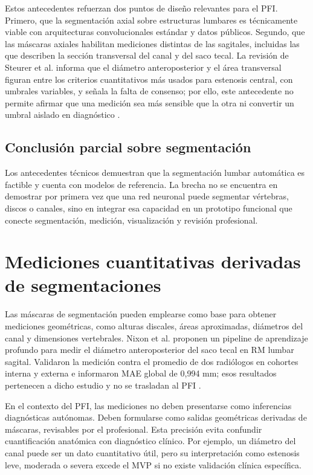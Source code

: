 Estos antecedentes refuerzan dos puntos de diseño relevantes para el PFI. Primero, que la segmentación axial sobre estructuras lumbares es técnicamente viable con arquitecturas convolucionales estándar y datos públicos. Segundo, que las máscaras axiales habilitan mediciones distintas de las sagitales, incluidas las que describen la sección transversal del canal y del saco tecal. La revisión de Steurer et al. informa que el diámetro anteroposterior y el área transversal figuran entre los criterios cuantitativos más usados para estenosis central, con umbrales variables, y señala la falta de consenso; por ello, este antecedente no permite afirmar que una medición sea más sensible que la otra ni convertir un umbral aislado en diagnóstico \parencite{steurer_lumbar_stenosis_2011}.

\subsection{Conclusión parcial sobre segmentación}

Los antecedentes técnicos demuestran que la segmentación lumbar automática es factible y cuenta con modelos de referencia. La brecha no se encuentra en demostrar por primera vez que una red neuronal puede segmentar vértebras, discos o canales, sino en integrar esa capacidad en un prototipo funcional que conecte segmentación, medición, visualización y revisión profesional.

\section{Mediciones cuantitativas derivadas de segmentaciones}

Las máscaras de segmentación pueden emplearse como base para obtener mediciones geométricas, como alturas discales, áreas aproximadas, diámetros del canal y dimensiones vertebrales. Nixon et al. proponen un pipeline de aprendizaje profundo para medir el diámetro anteroposterior del saco tecal en RM lumbar sagital. Validaron la medición contra el promedio de dos radiólogos en cohortes interna y externa e informaron MAE global de 0,994 mm; esos resultados pertenecen a dicho estudio y no se trasladan al PFI \parencite{perumal_thecal_sac_2026}.

En el contexto del PFI, las mediciones no deben presentarse como inferencias diagnósticas autónomas. Deben formularse como salidas geométricas derivadas de máscaras, revisables por el profesional. Esta precisión evita confundir cuantificación anatómica con diagnóstico clínico. Por ejemplo, un diámetro del canal puede ser un dato cuantitativo útil, pero su interpretación como estenosis leve, moderada o severa excede el MVP si no existe validación clínica específica.

